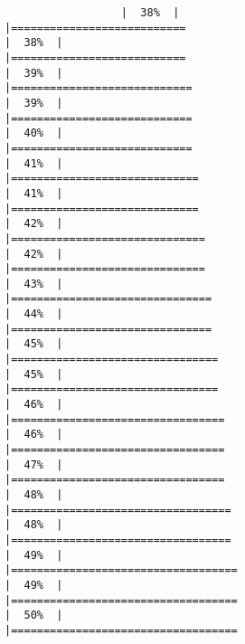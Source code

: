 \documentclass[
]{article}
\begin{document}
\begin{verbatim}
                  |  38%  |                                                                              |===========================                                           |  38%  |                                                                              |===========================                                           |  39%  |                                                                              |============================                                          |  39%  |                                                                              |============================                                          |  40%  |                                                                              |============================                                          |  41%  |                                                                              |=============================                                         |  41%  |                                                                              |=============================                                         |  42%  |                                                                              |==============================                                        |  42%  |                                                                              |==============================                                        |  43%  |                                                                              |===============================                                       |  44%  |                                                                              |===============================                                       |  45%  |                                                                              |================================                                      |  45%  |                                                                              |================================                                      |  46%  |                                                                              |=================================                                     |  46%  |                                                                              |=================================                                     |  47%  |                                                                              |=================================                                     |  48%  |                                                                              |==================================                                    |  48%  |                                                                              |==================================                                    |  49%  |                                                                              |===================================                                   |  49%  |                                                                              |===================================                                   |  50%  |                                                                              |===================================                  
\end{verbatim}
\end{document}
